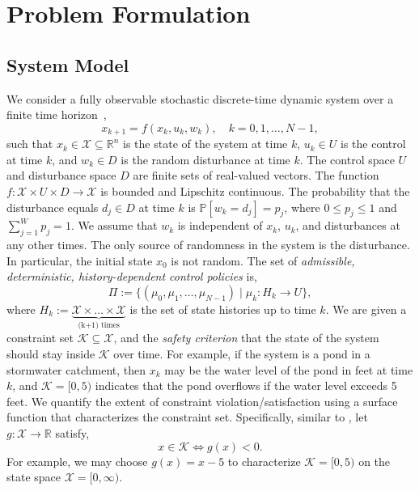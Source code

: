 \documentclass[letterpaper, 10 pt, conference]{ieeeconf}  %
\begin{document}
\section{Problem Formulation}\label{sec::problem}
%
\subsection{System Model}
We consider a fully observable stochastic discrete-time dynamic system over a finite time horizon~\cite[Sec. 1.2]{bertsekas2005dynamic},
\begin{equation}
x_{k+1} = f(x_k,u_k,w_k), \quad k = 0, 1, \dots, N-1,
\label{sys}
\end{equation}
such that $x_k \in \mathcal{X} \subseteq \mathbb{R}^n$ is the state of the system at time $k$,
$u_k \in U$ is the control at time $k$, and
$w_k \in D$ is the random disturbance at time $k$. The control space $U$ and disturbance space $D$ are finite sets of real-valued vectors.
The function $f : \mathcal{X} \times U \times D \rightarrow \mathcal{X}$ is bounded and Lipschitz continuous.
The probability that the disturbance equals $d_j \in D$ at time $k$ is $\mathbb{P}[w_k = d_j] = p_j$, 
where $0 \leq p_j \leq 1$ and $\sum_{j=1}^W p_j = 1$. We assume that $w_k$ is independent of $x_k$, $u_k$, and disturbances at any other times.  
The only source of randomness in the system is the disturbance.
In particular, the initial state $x_0$ is not random. 
The set of \textit{admissible, deterministic, history-dependent control policies} is,
%
\begin{equation}
\Pi := \big\{ (\mu_0, \mu_1, \dots, \mu_{N-1}) \mid \mu_k: H_k \rightarrow U \big\},
\label{pi}
\end{equation}
%
where $H_k := \underbrace{\mathcal{X} \times \hdots \times \mathcal{X}}_{\text{(k+1) times}}$ is the set of state histories up to time $k$.
We are given a constraint set $\mathcal{K} \subseteq \mathcal{X}$, and the \textit{safety criterion} that 
the state of the system should stay inside $\mathcal{K}$ over time. 
For example, if the system is a pond in a stormwater catchment, then $x_k$ may be the water level of the pond in feet at time $k$,
and $\mathcal{K} = [0, 5)$ indicates that the pond overflows if the water level exceeds 5 feet.
We quantify the extent of constraint violation/satisfaction using a surface function that characterizes the constraint set.
Specifically, similar to \cite[Eq. 2.3]{EECS-2018-41}, let $g: \mathcal{X} \rightarrow \mathbb{R}$ satisfy,
%
\begin{equation}
x \in \mathcal{K} \iff g(x) < 0.
\label{g}
\end{equation}
%
For example, we may choose $g(x) = x - 5$ to characterize $\mathcal{K} = [0, 5)$ on the state space
$\mathcal{X} = [0, \infty)$.
\end{document}
